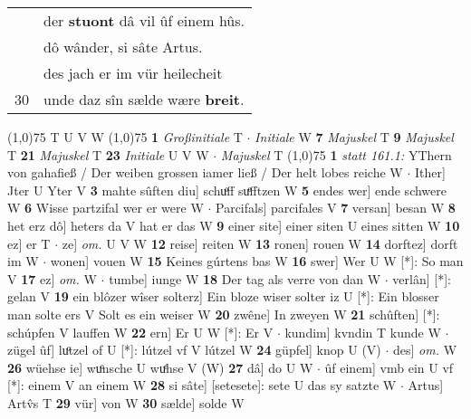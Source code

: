 \documentclass[8pt,a4paper,notitlepage]{article}
\begin{document}
\begin{table}[ht]
\begin{minipage}[t]{0.5\linewidth}
\begin{tabular}{rl}
 & der \textbf{stuont} dâ vil ûf einem hûs.\\ 
 & dô wânder, si sâte Artus.\\ 
 & des jach er im vür heilecheit\\ 
30 & unde daz sîn sælde wære \textbf{breit}.\\ 
\end{tabular}
\scriptsize
\line(1,0){75} \newline
T U V W \newline
\line(1,0){75} \newline
\textbf{1} \textit{Großinitiale} T   $\cdot$ \textit{Initiale} W  \textbf{7} \textit{Majuskel} T  \textbf{9} \textit{Majuskel} T  \textbf{21} \textit{Majuskel} T  \textbf{23} \textit{Initiale} U V W   $\cdot$ \textit{Majuskel} T  \newline
\line(1,0){75} \newline
\textbf{1} \textit{statt 161.1:} YThern von gahafieß / Der weiben grossen iamer ließ / Der helt lobes reiche W   $\cdot$ Ither] Jter U Yter V \textbf{3} mahte sûften diu] schuͦff suͤfftzen W \textbf{5} endes wer] ende schwere W \textbf{6} Wisse partzifal wer er were W  $\cdot$ Parcifals] parcifales V \textbf{7} versan] besan W \textbf{8} het erz dô] heters da V hat er das W \textbf{9} einer site] einer siten U eines sitten W \textbf{10} ez] er T  $\cdot$ ze] \textit{om.} U V W \textbf{12} reise] reiten W \textbf{13} ronen] rouen W \textbf{14} dorftez] dorft im W  $\cdot$ wonen] vouen W \textbf{15} Keines gúrtens bas W \textbf{16} swer] Wer U W [*]: So man V \textbf{17} ez] \textit{om.} W  $\cdot$ tumbe] iunge W \textbf{18} Der tag als verre von dan W  $\cdot$ verlân] [*]: gelan V \textbf{19} ein blôzer wîser solterz] Ein bloze wiser solter iz U [*]: Ein blosser man solte ers V Solt es ein weiser W \textbf{20} zwêne] In zweyen W \textbf{21} schûften] [*]: schúpfen V lauffen W \textbf{22} ern] Er U W [*]: Er V  $\cdot$ kundim] kvndin T kunde W  $\cdot$ zügel ûf] luͦtzel of U [*]: lútzel vf V lútzel W \textbf{24} güpfel] knop U (V)  $\cdot$ des] \textit{om.} W \textbf{26} wüehse ie] wuͦnsche U wuͤhse V (W) \textbf{27} dâ] do U W  $\cdot$ ûf einem] vmb ein U vf [*]: einem V an einem W \textbf{28} si sâte] [setesete]: sete U das sy satzte W  $\cdot$ Artus] Artv̂s T \textbf{29} vür] von W \textbf{30} sælde] solde W \newline
\end{minipage}
\end{table}
\end{document}
